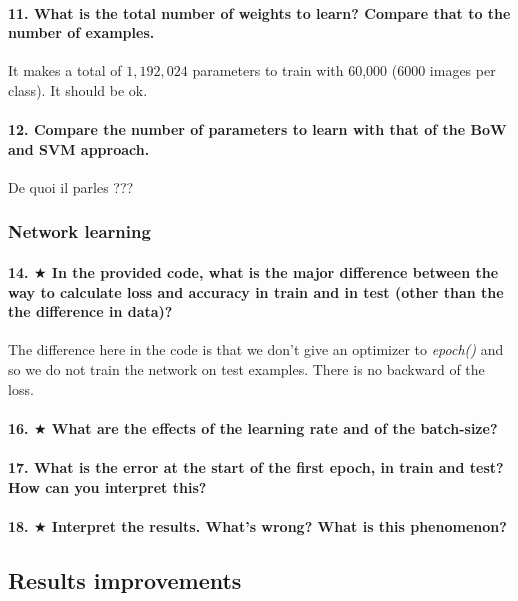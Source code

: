 \documentclass{article}
\theoremstyle{plain}%
\theoremstyle{definition}
\theoremstyle{remark}
\begin{document}
\paragraph{11. What is the total number of weights to learn? Compare that to the number of examples.}
It makes a total of $ 1,192,024 $ parameters to train with 60,000 (6000 images per class). It should be ok.

\paragraph{12. Compare the number of parameters to learn with that of the BoW and SVM approach.}
De quoi il parles ???

\subsubsection{Network learning}
\paragraph{14. $ \bigstar $ In the provided code, what is the major difference between the way to calculate loss and accuracy in train and in test (other than the the difference in data)?}
The difference here in the code is that we don't give an optimizer to \textit{epoch()} and so we do not train the network on test examples. There is no backward of the loss.

\paragraph{16. $ \bigstar $ What are the effects of the learning rate and of the batch-size?}

\paragraph{17. What is the error at the start of the first epoch, in train and test? How can you interpret this?}

\paragraph{18. $ \bigstar $ Interpret the results. What's wrong? What is this phenomenon?}

\subsection{Results improvements}
\end{document}
